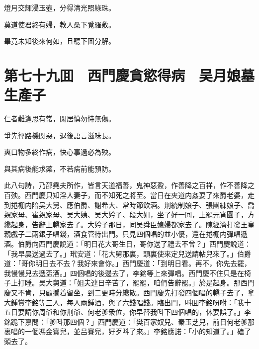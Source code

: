燈月交輝浸玉壺，分得清光照綠珠。

莫道使君終有婦，教人桑下覓羅敷。

畢竟未知後來何如，且聽下囬分解。

\chapter*{第七十九囬　西門慶貪慾得病　吴月娘墓生產子}

仁者難逢思有常，閑居慎勿恃無傷。

爭先徑路機関惡，退後語言滋味長。

爽口物多終作病，快心事過必為殃。

與其病後能求薬，不若病前能預防。

此八句詩，乃邵堯夫所作，皆言天道福善，鬼神惡盈，作善降之百祥，作不善降之百殃。西門慶只知淫人妻子，而不知死之將至。當日在夾道内姦耍了來爵老婆，走到捲棚内陪吴大舅、應伯爵、謝希大、常時節飲酒。荆統制娘子、張團練娘子、喬親家母、崔親家母、吴大姨、吴大妗子、段大姐，坐了好一囘，上罷元宵圓子，方纔起身，告辭上轎家去了。大妗子那日，同吴舜臣媳婦都家去了。陳經濟打發王皇親戲子二兩銀子唱錢，酒食管待出門。只見四個唱的並小優，還在捲棚内彈唱遞酒。伯爵向西門慶說道：「明日花大哥生日，哥你送了禮去不曾？」西門慶說道：「我早晨送過去了。」玳安道：「花大舅那裏，頭裏使來定兒送請帖兒來了。」伯爵道：「哥你明日去不去？我好來會你。」西門慶道：「到明日看。再不，你先去罷，我慢慢兒去遞盃酒。」四個唱的後邊去了，李銘等上來彈唱。西門慶不住只是在椅子上打睡。吴大舅道：「姐夫連日辛苦了，罷罷，咱們告辭罷。」於是起身。那西門慶又不肯，只顧攔着留坐，到二更時分纔散。西門慶先打發四個唱的轎子去了，拿大鍾賞李銘等三人，每人兩鍾酒，與了六錢唱錢。臨出門，呌囬李銘吩咐：「我十五日要請你周爺和你荆爺、何老爹衆位，你早替我呌下四個唱的，休要誤了。」李銘跪下禀問：「爹呌那四個？」西門慶道：「樊百家奴兒、秦玉芝兒，前日何老爹那裏唱的一個馮金寳兒，並吕賽兒，好歹呌了來。」李銘應諾：「小的知道了。」磕了頭去了。

